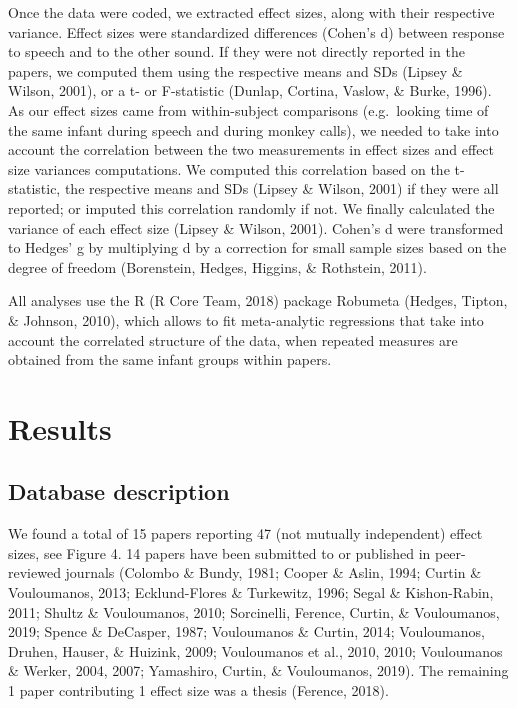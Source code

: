 \documentclass[man,floatsintext]{apa6}
\begin{document}
Once the data were coded, we extracted effect sizes, along with their respective variance. Effect sizes were standardized differences (Cohen's d) between response to speech and to the other sound.
If they were not directly reported in the papers, we computed them using the respective means and SDs (Lipsey \& Wilson, 2001), or a t- or F-statistic (Dunlap, Cortina, Vaslow, \& Burke, 1996). As our effect sizes came from within-subject comparisons (e.g.~looking time of the same infant during speech and during monkey calls), we needed to take into account the correlation between the two measurements in effect sizes and effect size variances computations. We computed this correlation based on the t-statistic, the respective means and SDs (Lipsey \& Wilson, 2001) if they were all reported; or imputed this correlation randomly if not. We finally calculated the variance of each effect size (Lipsey \& Wilson, 2001). Cohen's d were transformed to Hedges' g by multiplying d by a correction for small sample sizes based on the degree of freedom (Borenstein, Hedges, Higgins, \& Rothstein, 2011).

All analyses use the R (R Core Team, 2018) package Robumeta (Hedges, Tipton, \& Johnson, 2010), which allows to fit meta-analytic regressions that take into account the correlated structure of the data, when repeated measures are obtained from the same infant groups within papers.

\hypertarget{results}{%
\section{Results}\label{results}}

\hypertarget{database-description}{%
\subsection{Database description}\label{database-description}}

We found a total of 15 papers reporting 47 (not mutually independent) effect sizes, see Figure 4. 14 papers have been submitted to or published in peer-reviewed journals (Colombo \& Bundy, 1981; Cooper \& Aslin, 1994; Curtin \& Vouloumanos, 2013; Ecklund-Flores \& Turkewitz, 1996; Segal \& Kishon-Rabin, 2011; Shultz \& Vouloumanos, 2010; Sorcinelli, Ference, Curtin, \& Vouloumanos, 2019; Spence \& DeCasper, 1987; Vouloumanos \& Curtin, 2014; Vouloumanos, Druhen, Hauser, \& Huizink, 2009; Vouloumanos et al., 2010, 2010; Vouloumanos \& Werker, 2004, 2007; Yamashiro, Curtin, \& Vouloumanos, 2019). The remaining 1 paper contributing 1 effect size was a thesis (Ference, 2018).
\end{document}
